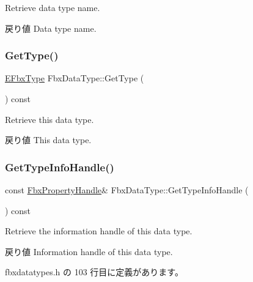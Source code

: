 Retrieve data type name. \begin{DoxyReturn}{戻り値}
Data type name. 
\end{DoxyReturn}
\mbox{\label{class_fbx_data_type_a0f3e5c89c7ea0f28aab4b6e6b823d069}} 
\subsubsection{\texorpdfstring{Get\+Type()}{GetType()}}
{\footnotesize\ttfamily \hyperlink{fbxpropertytypes_8h_a73913a5ddfb20e57c6f25e9e6784bd92}{E\+Fbx\+Type} Fbx\+Data\+Type\+::\+Get\+Type (\begin{DoxyParamCaption}{ }\end{DoxyParamCaption}) const}

Retrieve this data type. \begin{DoxyReturn}{戻り値}
This data type. 
\end{DoxyReturn}
\mbox{\label{class_fbx_data_type_a425634131ed095605fd6480e997e7891}} 
\subsubsection{\texorpdfstring{Get\+Type\+Info\+Handle()}{GetTypeInfoHandle()}}
{\footnotesize\ttfamily const \hyperlink{class_fbx_property_handle}{Fbx\+Property\+Handle}\& Fbx\+Data\+Type\+::\+Get\+Type\+Info\+Handle (\begin{DoxyParamCaption}{ }\end{DoxyParamCaption}) const\hspace{0.3cm}{\ttfamily [inline]}}

Retrieve the information handle of this data type. \begin{DoxyReturn}{戻り値}
Information handle of this data type. 
\end{DoxyReturn}


 fbxdatatypes.\+h の 103 行目に定義があります。

\mbox{\label{class_fbx_data_type_ad0bd5c5341dd1dd93b302eb7a0475c81}} 
